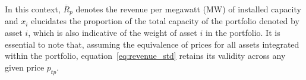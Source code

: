     In this context, $\overline{R}_{p}$ denotes the revenue per megawatt (MW) of installed capacity and $x_{i}$
    elucidates the proportion of the total capacity of the portfolio denoted by asset $i$,
    which is also indicative of the weight of asset $i$ in the portfolio.
    It is essential to note that, assuming the equivalence of prices for all assets integrated within the portfolio,
    equation~\ref{eq:revenue_std} retains its validity across any given price $p_{tp}$.







